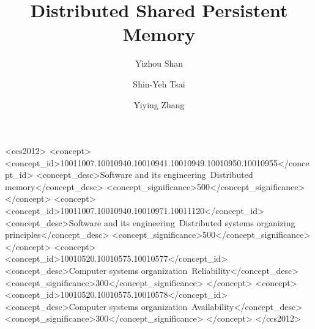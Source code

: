 \documentclass[sigconf]{acmart}
\begin{document}
%
%
\title{Distributed Shared Persistent Memory}

\author{Yizhou Shan}
\author{Shin-Yeh Tsai}
\author{Yiying Zhang}

\renewcommand{\shortauthors}{Y. Shan et al.}




%
%
\begin{CCSXML}
<ccs2012>
<concept>
<concept_id>10011007.10010940.10010941.10010949.10010950.10010955</concept_id>
<concept_desc>Software and its engineering~Distributed memory</concept_desc>
<concept_significance>500</concept_significance>
</concept>
<concept>
<concept_id>10011007.10010940.10010971.10011120</concept_id>
<concept_desc>Software and its engineering~Distributed systems organizing principles</concept_desc>
<concept_significance>500</concept_significance>
</concept>
<concept>
<concept_id>10010520.10010575.10010577</concept_id>
<concept_desc>Computer systems organization~Reliability</concept_desc>
<concept_significance>300</concept_significance>
</concept>
<concept>
<concept_id>10010520.10010575.10010578</concept_id>
<concept_desc>Computer systems organization~Availability</concept_desc>
<concept_significance>300</concept_significance>
</concept>
</ccs2012>
\end{CCSXML}



%
%
\maketitle









  




\clearpage


\end{document}
